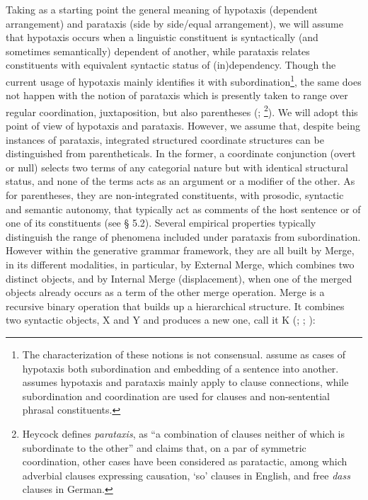 \documentclass[output=paper,colorlinks,citecolor=brown,
]{langscibook}
\begin{document}
Taking as a starting point the general meaning of hypotaxis (dependent arrangement) and parataxis (side by side/equal arrangement), we will assume that hypotaxis occurs when a linguistic constituent is syntactically (and sometimes semantically) dependent of another, while parataxis relates constituents with equivalent syntactic status of (in)dependency. Though the current usage of hypotaxis mainly identifies it with subordination\footnote{The characterization of these notions is not consensual. \citet[919]{quirk_comprehensive_1985} assume as cases of hypotaxis both subordination and embedding of a sentence into another. \citet[3513]{lopez_garcia_relaciones_1999} assumes hypotaxis and parataxis mainly apply to clause connections, while subordination and coordination are used for clauses and non-sentential phrasal constituents.}, the same does not happen with the notion of parataxis which is presently taken to range over regular coordination, juxtaposition, but also parentheses (\citealt[911--919]{quirk_comprehensive_1985}; \citealt[178]{heycock_embedded_2006}\footnote{Heycock defines \textit{parataxis}, as “a combination of clauses neither of which is subordinate to the other” and claims that, on a par of symmetric coordination, other cases have been considered as paratactic, among which adverbial clauses expressing causation, ‘so’ clauses in English, and free \textit{dass} clauses in German.}). We will adopt this point of view of hypotaxis and parataxis. However, we assume that, despite being instances of parataxis, integrated structured coordinate structures can be distinguished from parentheticals. In the former, a coordinate conjunction (overt or null) selects two terms of any categorial nature but with identical structural status, and none of the terms acts as an argument or a modifier of the other. As for parentheses, they are non-integrated constituents, with prosodic, syntactic and semantic autonomy, that typically act as comments of the host sentence or of one of its constituents (see § 5.2). Several empirical properties typically distinguish the range of phenomena included under parataxis from subordination. However within the generative grammar framework, they are all built by Merge, in its different modalities, in particular, by External Merge, which combines two distinct objects, and by Internal Merge (displacement), when one of the merged objects already occurs as a term of the other merge operation. Merge is a recursive binary operation that builds up a hierarchical structure. It combines two syntactic objects, X and Y and produces a new one, call it K (\citealt{chomsky_problems_2013}; \citeyear{chomsky_problems_2015}; \citealt{chomsky_generative_2019}): 
\end{document}
